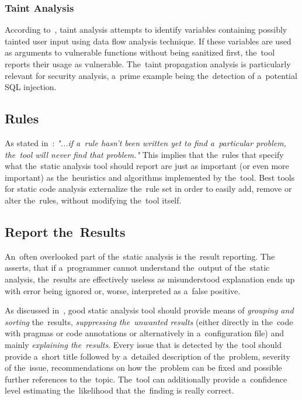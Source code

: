 \documentclass[
  digital, %
  table,   %
  lof,     %
  lot,     %
  oneside,
]{fithesis3}
\begin{document}
\subsubsection{\textbf{Taint Analysis}}
According to~\cite{oswap-sca}, taint analysis attempts to identify variables containing possibly tainted user input using data flow analysis technique. If these variables are used as arguments to vulnerable functions without being sanitized first, the~tool reports their usage as vulnerable. The~taint propagation analysis is particularly relevant for security analysis, a~prime example being the~detection of a~potential SQL injection.

\subsection{Rules}
As stated in~\cite{sca-for-security}: \textit{"...if a~rule hasn’t been written yet to find a~particular problem, the~tool will never find that problem."} This implies that the~rules that specify what the~static analysis tool should report are just as important (or even more important) as the~heuristics and algorithms implemented by the~tool. Best tools for static code analysis externalize the~rule set in order to easily add, remove or alter the~rules, without modifying the~tool itself.

\subsection{Report the~Results}
An~often overlooked part of the~static analysis is the~result reporting. The~\cite{coverity-sca} asserts, that if a~programmer cannot understand the~output of the~static analysis, the~results are effectively useless as misunderstood explanation ends up with error being ignored or, worse, interpreted as a~false positive.

As discussed in~\cite{secure-programming-with-sca}, good static analysis tool should provide means of \textit{grouping and sorting} the~results, \textit{suppressing the~unwanted results} (either directly in the~code with pragmas or code annotations or alternatively in a~configuration file) and mainly \textit{explaining the~results}. Every issue that is detected by the~tool should provide a~short title followed by a~detailed description of the~problem, severity of the~issue, recommendations on how the~problem can be fixed and possible further references to the~topic. The~tool can additionally provide a~confidence level estimating the~likelihood that the~finding is really correct.
\end{document}
